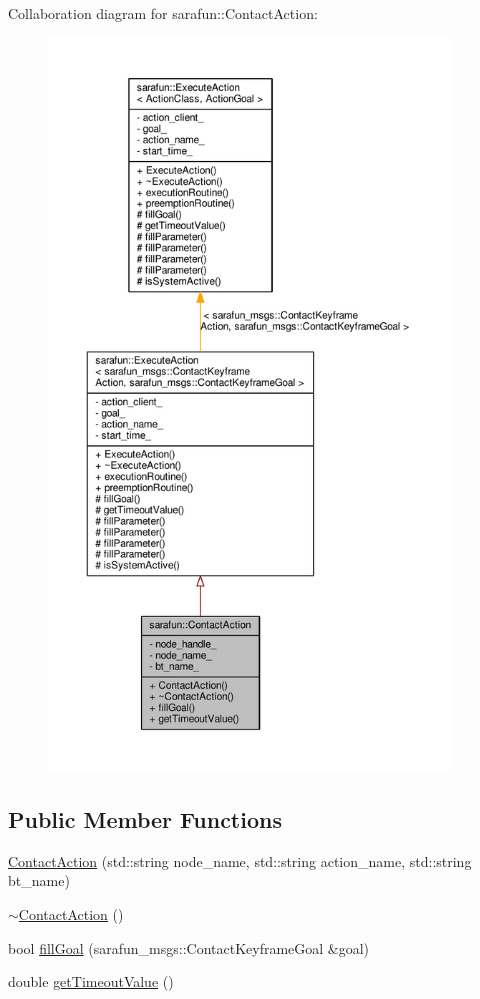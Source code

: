 Collaboration diagram for sarafun\-:\-:Contact\-Action\-:
\nopagebreak
\begin{figure}[H]
\begin{center}
\leavevmode
\includegraphics[height=550pt]{d3/d7e/classsarafun_1_1ContactAction__coll__graph}
\end{center}
\end{figure}
\subsection*{Public Member Functions}
\begin{DoxyCompactItemize}
\item 
\hyperlink{classsarafun_1_1ContactAction_a8374da0d20d05fe01b86f2090b2c1770_a8374da0d20d05fe01b86f2090b2c1770}{Contact\-Action} (std\-::string node\-\_\-name, std\-::string action\-\_\-name, std\-::string bt\-\_\-name)
\item 
\hyperlink{classsarafun_1_1ContactAction_a22429fcb44fbe815f745b4924ed08f34_a22429fcb44fbe815f745b4924ed08f34}{$\sim$\-Contact\-Action} ()
\item 
bool \hyperlink{classsarafun_1_1ContactAction_a563907411debe223088ef5a34d8c0fb0_a563907411debe223088ef5a34d8c0fb0}{fill\-Goal} (sarafun\-\_\-msgs\-::\-Contact\-Keyframe\-Goal \&goal)
\item 
double \hyperlink{classsarafun_1_1ContactAction_a85d81232d228fc6d2856d318d25c1bf9_a85d81232d228fc6d2856d318d25c1bf9}{get\-Timeout\-Value} ()
\end{DoxyCompactItemize}
